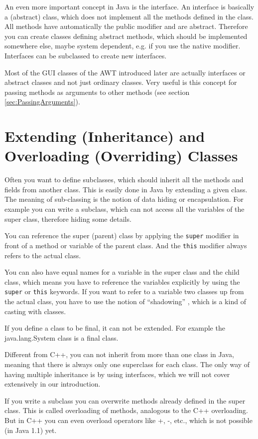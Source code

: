 An even more important concept in Java is the interface.
An interface is basically a (abstract) class, which does not implement 
all the
methods defined in the class. All methods have automatically the public
modifier and are abstract.
Therefore you can create classes defining abstract methods,
which should be implemented somewhere else, maybe system dependent, e.g. if you use
the native modifier. Interfaces can be subclassed
to create new interfaces.

Most of the GUI classes of the AWT introduced later are
actually interfaces or abstract classes and not just ordinary classes.
Very useful is this concept for passing methods as arguments to
other methods (see section \ref{sec:PassingArguments}).


\section{Extending (Inheritance) and Overloading (Overriding) Classes}
Often you want to define subclasses, which should inherit all
the methods and fields from another class. This is easily done
in Java by extending a given class. The meaning of sub-classing is the
notion of data hiding or encapsulation. For example you can write
a subclass, which can not access all the variables of the super class,
therefore hiding some details. 

You can reference the super (parent) class by applying the
\verb|super| modifier in front of a method or variable of
the parent class. And the \verb|this| modifier always refers to
the actual class. 

You can also have equal names for a variable in the super class and the
child class, which means you have to reference the variables explicitly
by using the \verb|super| or \verb|this| keywords. If you want to refer
to a variable two classes up from the actual class, you have to use
the notion of ``shadowing'' \cite[]{javanutshell}, which is a kind of
casting with classes. 

If you define a class to be final, it can not be extended.
For example the java.lang.System class is a final class.

Different from C++,  you can not inherit from more than one class
in Java, meaning that there is always only one superclass for each
class. 
The only way of having multiple inheritance is by using
interfaces, which we will not cover extensively in our introduction.

If you write a subclass you can overwrite methods already defined
in the super class. This is called overloading of methods,
analogous to the C++ overloading. But in C++ you can even
overload operators like +, -, etc., which is not possible (in Java 1.1) yet.

